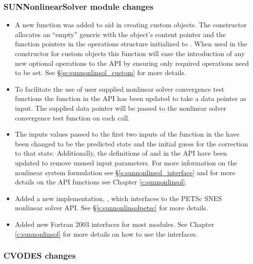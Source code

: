 \subsubsection*{SUNNonlinearSolver module changes}

\begin{itemize}
\item A new function was added to aid in creating custom {\sunnonlinsol}
objects. The constructor  allocates an ``empty''
generic {\sunnonlinsol} with the object's content pointer and the function
pointers in the operations structure initialized to . When used in the
constructor for custom objects this function will ease the introduction of any
new optional operations to the {\sunnonlinsol} API by ensuring only
required operations need to be set. See \S\ref{ss:sunnonlinsol_custom} for more
details.
%
\item To facilitate the use of user supplied nonlinear solver convergence test
functions the \newline\noindent
{} function in the
{\sunnonlinsol} API has been updated to take a  data pointer as
input. The supplied data pointer will be passed to the nonlinear solver
convergence test function on each call.
%
\item The inputs values passed to the first two inputs of the 
function in the {\sunnonlinsol} have been changed to be the predicted
state and the initial guess for the correction to that state. Additionally,
the definitions of  and  in
the {\sunnonlinsol} API have been updated to remove unused input
parameters. For more information on the nonlinear system formulation see
\S\ref{s:sunnonlinsol_interface} and for more details on the API functions see
Chapter \ref{c:sunnonlinsol}.
%
\item Added a new {\sunnonlinsol} implementation, {\sunnonlinsolpetsc}, which
interfaces to the PETSc SNES nonlinear solver API. See
\S\ref{s:sunnonlinsolpetsc} for more details.
%
\item Added new Fortran 2003 interfaces for most {\sunnonlinsol} modules. See
Chapter \ref{c:sunnonlinsol} for more details on how to use the interfaces.
\end{itemize}

\subsubsection*{CVODES changes}

